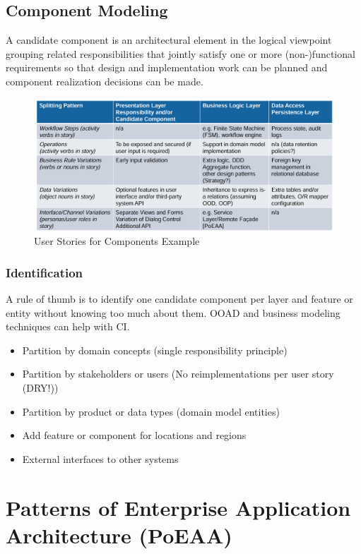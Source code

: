 \documentclass[../Main.tex]{subfiles}
\begin{document}
\subsection{Component Modeling}
A candidate component is an architectural element in the logical 
viewpoint grouping related responsibilities that jointly satisfy
one or more (non-)functional requirements so that design and
implementation work can be planned and component realization
decisions can be made.

\begin{figure}[H]
    \centering
    \includegraphics[width=1\linewidth]{Images/user-stories-components.png}
    \caption{User Stories for Components Example}
\end{figure}

\subsubsection{Identification}
A rule of thumb is to identify one candidate component per layer and
feature or entity without knowing too much about them.
OOAD and business modeling techniques can help with CI.
\begin{itemize}
    \item Partition by domain concepts (single responsibility principle)
    \item Partition by stakeholders or users (No reimplementations per user story (DRY!))
    \item Partition by product or data types (domain model entities)
    \item Add feature or component for locations and regions
    \item External interfaces to other systems
\end{itemize}

\section{Patterns of Enterprise Application Architecture (PoEAA)}
\end{document}
